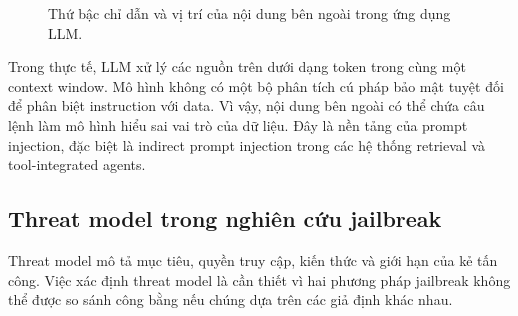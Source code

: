 \begin{figure}[H]
\centering
{}
\caption{Thứ bậc chỉ dẫn và vị trí của nội dung bên ngoài trong ứng dụng LLM.}
\label{fig:instruction-hierarchy}
\end{figure}

Trong thực tế, LLM xử lý các nguồn trên dưới dạng token trong cùng một
context window. Mô hình không có một bộ phân tích cú pháp bảo mật tuyệt đối
để phân biệt instruction với data. Vì vậy, nội dung bên ngoài có thể chứa
câu lệnh làm mô hình hiểu sai vai trò của dữ liệu. Đây là nền tảng của
prompt injection, đặc biệt là indirect prompt injection trong các hệ thống
retrieval và tool-integrated agents.

\subsection{Threat model trong nghiên cứu jailbreak}
\label{subsec:jailbreak-threat-model}

Threat model mô tả mục tiêu, quyền truy cập, kiến thức và giới hạn của kẻ
tấn công. Việc xác định threat model là cần thiết vì hai phương pháp
jailbreak không thể được so sánh công bằng nếu chúng dựa trên các giả định
khác nhau.

